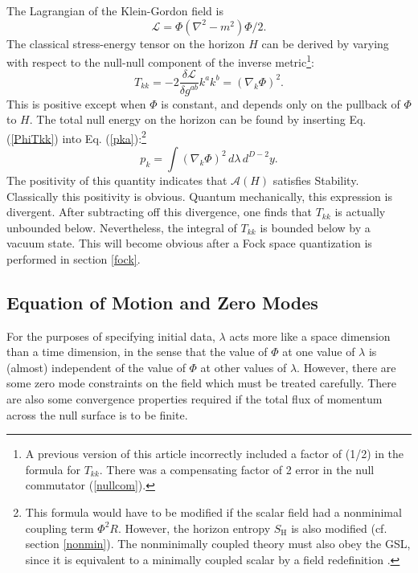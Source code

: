 \documentclass[12pt]{article}
\begin{document}
The Lagrangian of the Klein-Gordon field is
\begin{equation}
\mathcal{L} = \Phi(\nabla^2 - m^2)\Phi /2.
\end{equation}
The classical stress-energy tensor on the horizon $H$ can be derived by varying with respect to the null-null component of the inverse metric\footnote{A previous version of this article incorrectly included a factor of (1/2) in the formula for $T_{kk}$.  There was a compensating factor of 2 error in the null commutator (\ref{nullcom}).}:
\begin{equation}\label{PhiTkk}
T_{kk} = -2\frac{\mathcal{\delta L}}{\delta g^{ab}} k^a k^b = (\nabla_k \Phi)^2.
\end{equation}
This is positive except when $\Phi$ is constant, and depends only on the pullback of $\Phi$ to $H$.  The total null energy on the horizon can be found by inserting Eq. (\ref{PhiTkk}) into Eq. (\ref{pka}):\footnote{This formula would have to be modified if the scalar field had a nonminimal coupling term $\Phi^2 R$.  However, the horizon entropy $S_\mathrm{H}$ is also modified (cf. section \ref{nonmin}).  The nonminimally coupled theory must also obey the GSL, since it is equivalent to a minimally coupled scalar by a field redefinition \cite{2ndlaw}.}
\begin{equation}\label{nullE}
p_k = \int (\nabla_k \Phi)^2\,d\lambda\,d^{D-2}y.
\end{equation}
The positivity of this quantity indicates that $\mathcal{A}(H)$ satisfies Stability.  Classically this positivity is obvious.  Quantum mechanically, this expression is divergent.  After subtracting off this divergence, one finds that $T_{kk}$ is actually unbounded below.  Nevertheless, the integral of $T_{kk}$ is bounded below by a vacuum state.  This will become obvious after a Fock space quantization is performed in section \ref{fock}.

\subsection{Equation of Motion and Zero Modes}

For the purposes of specifying initial data, $\lambda$ acts more like a space dimension than a time dimension, in the sense that the value of $\Phi$ at one value of $\lambda$ is (almost) independent of the value of $\Phi$ at other values of $\lambda$.  However, there are some zero mode constraints on the field which must be treated carefully.  There are also some convergence properties required if the total flux of momentum across the null surface is to be finite.
\end{document}

